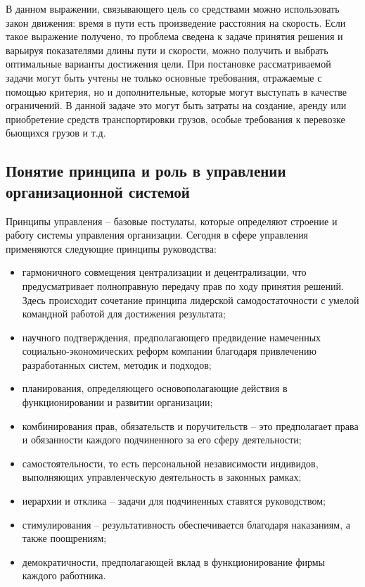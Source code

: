 \documentclass[a4paper,12pt,oneside,final]{extarticle}
\numberwithin{equation}{section}
\begin{document}
В данном выражении, связывающего цель со средствами можно использовать закон движения: время в пути есть произведение расстояния на скорость. 
Если такое выражение получено, то проблема сведена к задаче принятия решения и варьируя показателями длины пути и скорости, можно получить и выбрать оптимальные варианты достижения цели. 
При постановке рассматриваемой задачи могут быть учтены не только основные требования, отражаемые с помощью критерия, но и дополнительные, которые могут выступать в качестве ограничений. 
В данной задаче это могут быть затраты на создание, аренду или приобретение средств транспортировки грузов, особые требования к перевозке бьющихся грузов и т.д.

\subsection{Понятие принципа и роль в управлении организационной системой}
Принципы управления – базовые постулаты, которые определяют строение и работу системы управления организации. 
Сегодня в сфере управления применяются следующие принципы руководства: 
\begin{itemize}
	\item гармоничного совмещения централизации и децентрализации, что предусматривает полноправную передачу прав по ходу принятия решений. 
	Здесь происходит сочетание принципа лидерской самодостаточности с умелой командной работой для достижения результата; 
	\item научного подтверждения, предполагающего предвидение намеченных социально-экономических реформ компании благодаря привлечению разработанных систем, методик и подходов; 
	\item планирования, определяющего основополагающие действия в функционировании и развитии организации;
	\item комбинирования прав, обязательств и поручительств – это предполагает права и обязанности каждого подчиненного за его сферу деятельности; 
	\item самостоятельности, то есть персональной независимости индивидов, выполняющих управленческую деятельность в законных рамках; 
	\item иерархии и отклика – задачи для подчиненных ставятся руководством; 
	\item стимулирования – результативность обеспечивается благодаря наказаниям, а также поощрениям;
	\item демократичности, предполагающей вклад в функционирование фирмы каждого работника.
\end{itemize}
\end{document}
